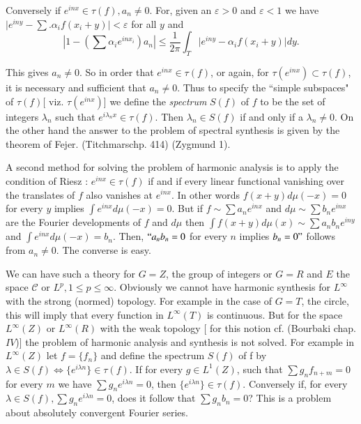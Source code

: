 Conversely if $e^{inx} \in \tau (f), a_n \neq 0$. For, given an
$\varepsilon > 0$ and $\varepsilon <1$ we have $\Bigg| e^{iny}- \sum
.\alpha_i f(x_i+y) \Bigg| < \varepsilon$ for all $y$ and 
$$
\left| 1-\left(\sum \alpha_i e^{inx_i}\right) a_n \right| \leq \frac{1}{2 \pi}
\int_T \Bigg| e^{iny}- \alpha_i f(x_i + y) \Bigg| dy. 
$$

This gives $a_n \neq 0$. So in order that $e^{inx} \in \tau (f)$, or
again, for $\tau (e^{inx}) \subset \tau (f)$, it is necessary and
sufficient that $a_n \neq 0$. Thus to specify the ``simple subspaces"
of $\tau (f) [$ viz. $\tau (e^{inx})$] we define the \textit{spectrum}
$S (f)$ of $f$ to be the set of integers $\lambda_n$ such that $e^{i
 \lambda_n x}\in \tau (f)$. Then $\lambda_n \in S(f)$ if and
only if a $\lambda_n \neq 0$. On the other hand the answer to the
problem of spectral synthesis is given by the theorem of
Fejer. (Titchmarsch\pageoriginale p. 414) (Zygmund 1). 

A second method for solving the problem of harmonic analysis is to
apply the condition of Riesz : $e^{inx} \in \tau (f)$ if and if every
linear functional vanishing over the translates of $f$ also vanishes
at $e^{inx}$. In other words $f (x + y) d \mu (-x) = 0$ for every
$y$ implies $\int e^{inx} d \mu (-x) = 0$. But if $f \sim \sum a_n
e^{inx}$ and $d \mu \sim \sum b_n e^{inx}$ are the Fourier
developments of $f$ and $d \mu$ then $\int f(x+y) d \mu(x) \sim \sum a_n
b_n e^{iny}$ and $\int e^{inx} d \mu (-x) = b_n$. Then, $``a_n b_n=0$
for every $n$ implies $b_n = 0"$ follows from $a_n \neq 0$. The
converse is easy. 

We can have such a theory for $G = Z$, the group of integers or $G =
R$ and $E$ the space $\mathscr{C}$ or $L^p, 1 \leq p \leq
\infty$. Obviously we cannot have harmonic synthesis for $L^{\infty}$
with the strong (normed) topology. For example in the case of $G=T$,
the circle, this will imply that every function in $L^{\infty} (T)$ is
continuous. But for the space $L^{\infty}(Z)$ or $L^{\infty}(R)$ with
the weak topology [ for this notion cf. (Bourbaki chap. $IV$)] the
problem of harmonic analysis and synthesis is not solved. For example
in $L^{\infty} (Z)$ let $f = \{f_n \}$ and define the spectrum $S (f)$
of f by $\lambda \in S (f) \Longleftrightarrow \{ e^{i \lambda n} \}
\in \tau (f)$. If for every $g \in L^1 (Z)$, such that $\sum g_n
f_{n+m} = 0$ for every $m$ we have $\sum g_n e^{i \lambda n} = 0$,
then $\{e^{i \lambda n} \} \in \tau (f)$. Conversely if, for every
$\lambda \in S (f), \sum g_n e^{i \lambda n} = 0$, does it follow
that $\sum g_n b_n =0$? This is a problem about absolutely convergent
Fourier series. 
